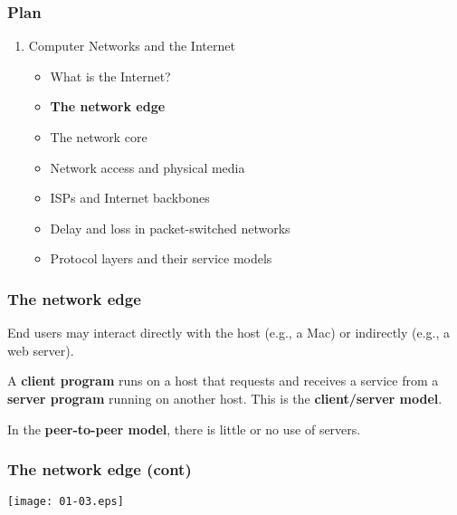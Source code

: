 
%
\begin{frame}
\frametitle{Plan}

\begin{enumerate}

  \item Computer Networks and the Internet

    \begin{itemize}

      \item What is the Internet?

      \item \textbf{The network edge}

      \item The network core

      \item Network access and physical media

      \item ISPs and Internet backbones

      \item Delay and loss in packet-switched networks
 
      \item Protocol layers and their service models

    \end{itemize}

\end{enumerate}

\end{frame}

%
\begin{frame}
\frametitle{The network edge}

End users may interact directly with the host (e.g., a Mac) or
indirectly (e.g., a web server).

\bigskip

A \textbf{client program} runs on a host that requests and receives
a service from a \textbf{server program} running on another
host. This is the \textbf{client/server model}.

\bigskip

In the \textbf{peer-to-peer model}, there is little or no use of
servers.

\end{frame}

%
\begin{frame}
\frametitle{The network edge (cont)}

\begin{center}
  \texttt{[image: 01-03.eps]}
\end{center}

\end{frame}

